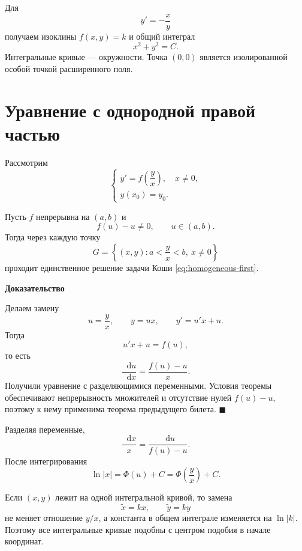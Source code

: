 \documentclass[12pt,a4paper]{article}
\numberwithin{equation}{section}
\newcommand{\dd}{\mathop{}\!\mathrm{d}}
\renewenvironment{proof}[1][Доказательство]{\begin{center}\textbf{#1}\end{center}}{\hfill$\blacksquare$\par}
\begin{document}
\begin{exampleHSE}
Для
\[
y'=-\frac{x}{y}
\]
получаем изоклины $f(x,y)=k$ и общий интеграл
\[
x^2+y^2=C.
\]
Интегральные кривые --- окружности. Точка $(0,0)$ является изолированной особой точкой расширенного поля.

\end{exampleHSE}

\section[Однородное уравнение]{Уравнение с однородной правой частью}

Рассмотрим
\begin{equation}
\begin{cases}
 y'=f\!\left(\dfrac{y}{x}\right),\quad x\neq0,\\
 y(x_0)=y_0.
\end{cases}
\label{eq:homogeneous-first}
\end{equation}

\begin{theoremHSE}
Пусть $f$ непрерывна на $(a,b)$ и
\[
f(u)-u\neq0,\qquad u\in(a,b).
\]
Тогда через каждую точку
\[
G=\left\{(x,y):a<\frac{y}{x}<b,\ x\neq0\right\}
\]
проходит единственное решение задачи Коши \eqref{eq:homogeneous-first}.
\end{theoremHSE}

\begin{proof}
Делаем замену
\[
u=\frac{y}{x},\qquad y=ux,\qquad y'=u'x+u.
\]
Тогда
\[
u'x+u=f(u),
\]
то есть
\[
\frac{\dd u}{\dd x}=\frac{f(u)-u}{x}.
\]
Получили уравнение с разделяющимися переменными. Условия теоремы обеспечивают непрерывность множителей и отсутствие нулей $f(u)-u$, поэтому к нему применима теорема предыдущего билета.
\end{proof}

Разделяя переменные,
\[
\frac{\dd x}{x}=\frac{\dd u}{f(u)-u}.
\]
После интегрирования
\[
\ln|x|=\Phi(u)+C
=
\Phi\!\left(\frac{y}{x}\right)+C.
\]

\begin{corollaryHSE}
Если $(x,y)$ лежит на одной интегральной кривой, то замена
\[
\widetilde x=kx,\qquad \widetilde y=ky
\]
не меняет отношение $y/x$, а константа в общем интеграле изменяется на $\ln|k|$. Поэтому все интегральные кривые подобны с центром подобия в начале координат.
\end{corollaryHSE}
\end{document}
